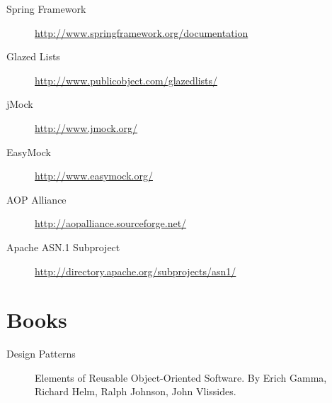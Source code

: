 \begin{description}
 \item[Spring Framework] \href{http://www.springframework.org/documentation}{http://www.springframework.org/documentation}
 \item[Glazed Lists] \href{http://www.publicobject.com/glazedlists/}{http://www.publicobject.com/glazedlists/}
 \item[jMock] \href{http://www.jmock.org/}{http://www.jmock.org/}
 \item[EasyMock] \href{http://www.easymock.org/}{http://www.easymock.org/}
 \item[AOP Alliance] \href{http://aopalliance.sourceforge.net/}{http://aopalliance.sourceforge.net/}
 \item[Apache ASN.1 Subproject] \href{http://directory.apache.org/subprojects/asn1/}{http://directory.apache.org/subprojects/asn1/}
\end{description}



\section{Books}
\begin{description}
 \item[Design Patterns] Elements of Reusable Object-Oriented Software. By Erich Gamma, Richard Helm, Ralph Johnson, John Vlissides.
\end{description}
